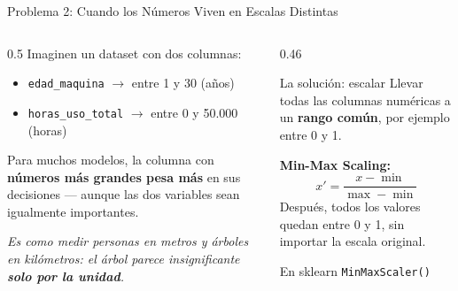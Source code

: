 \documentclass[aspectratio=169]{beamer}
\newcommand{\tech}[1]{\texttt{\textcolor{mainColor}{#1}}}
\begin{document}
\begin{frame}{Problema 2: Cuando los Números Viven en Escalas Distintas}
  \begin{columns}[T]
    \begin{column}{0.5\textwidth}
      \small
      Imaginen un dataset con dos columnas:
      \vspace{0.15cm}
      \begin{itemize}\setlength\itemsep{2pt}
        \item \tech{edad\_maquina} $\rightarrow$ entre 1 y 30 (años)
        \item \tech{horas\_uso\_total} $\rightarrow$ entre 0 y 50.000 (horas)
      \end{itemize}

      \vspace{0.25cm}
      Para muchos modelos, la columna con \textbf{números más grandes pesa más} en sus decisiones --- aunque las dos variables sean igualmente importantes.

      \vspace{0.2cm}
      \textit{Es como medir personas en metros y árboles en kilómetros: el árbol parece insignificante \textbf{solo por la unidad}.}
    \end{column}
    \begin{column}{0.46\textwidth}
      \begin{conceptbox}{\faRulerCombined\enspace La solución: escalar}
        \small
        Llevar todas las columnas numéricas a un \textbf{rango común}, por ejemplo entre 0 y 1.
        \vspace{4pt}
        \par\textbf{Min-Max Scaling:}
        \[ x' = \frac{x - \min}{\max - \min} \]
        Después, todos los valores quedan entre 0 y 1, sin importar la escala original.
      \end{conceptbox}
      \vspace{0.1cm}
      \begin{alertblock}{\faPython\enspace En sklearn}
        \small\centering
        \tech{MinMaxScaler()}
      \end{alertblock}
    \end{column}
  \end{columns}
\end{frame}
\end{document}

